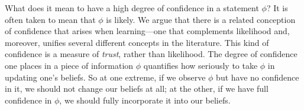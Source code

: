 What does it mean to have a high degree of confidence in a statement $\phi$? 
It is often taken to mean that $\phi$ is likely.
We argue that there is a related conception of confidence that arises when learning---one that complements likelihood and, moreover, unifies several different concepts in the literature.
This kind of confidence is a measure of \emph{trust}, rather than likelihood.
The degree of confidence one places in a piece of information $\phi$
quantifies how seriously to take $\phi$ in updating one's beliefs.
So at one extreme,
if we observe $\phi$ but have no confidence in it,
we should not change our beliefs at all;
at the other, if we have full confidence in $\phi$,
 we should fully incorporate it into our beliefs.

